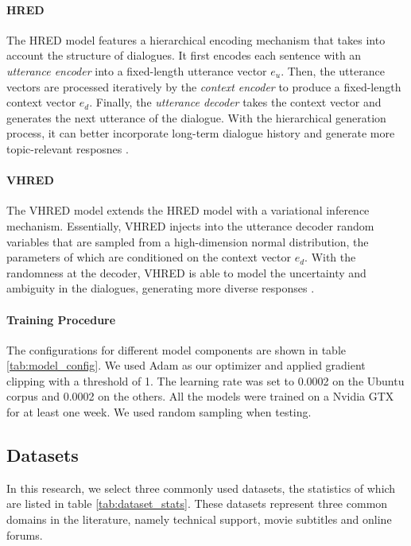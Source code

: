 \documentclass[conference]{IEEEtran}
\begin{document}
\paragraph{HRED}
The HRED model \cite{hred-qs,HRED} features a hierarchical encoding mechanism that takes into account the structure of dialogues. It first encodes each sentence with an \emph{utterance encoder} into a fixed-length utterance vector $e_u$. Then, the utterance vectors are processed iteratively by the \emph{context encoder} to produce a fixed-length context vector $e_d$. Finally, the \emph{utterance decoder} takes the context vector and generates the next utterance of the dialogue. With the hierarchical generation process, it can better incorporate long-term dialogue history and generate more topic-relevant resposnes \cite{A_Short_Review}.

\paragraph{VHRED}
The VHRED model \cite{VHRED} extends the HRED model with a variational inference mechanism. Essentially, VHRED injects into the utterance decoder random variables that are sampled from a high-dimension normal distribution, the parameters of which are conditioned on the context vector $e_d$. With the randomness at the decoder, VHRED is able to model the uncertainty and ambiguity in the dialogues, generating more diverse responses \cite{A_Short_Review}.

\paragraph{Training Procedure}
The configurations for different model components are shown in table \ref{tab:model_config}. We used Adam \cite{AdamOpt} as our optimizer and applied gradient clipping with a threshold of 1. The learning rate was set to 0.0002 on the Ubuntu corpus and 0.0002 on the others. All the models were trained on a Nvidia GTX for at least one week. We used random sampling when testing.


\subsection{Datasets}
In this research, we select three commonly used datasets, the statistics of which are listed in table \ref{tab:dataset_stats}. These datasets represent three common domains in the literature, namely technical support, movie subtitles and online forums.

\end{document}
